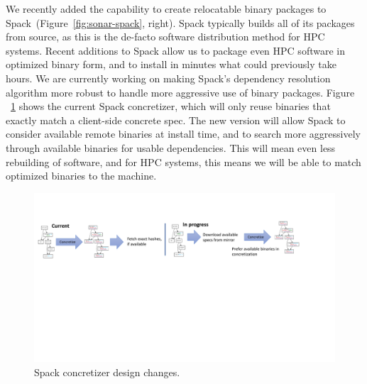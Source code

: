 We recently added the capability to create relocatable binary packages to
Spack~(Figure~\ref{fig:sonar-spack}, right).  Spack typically builds all
of its packages from source, as this is the de-facto software
distribution method for HPC systems. Recent additions to Spack allow us
to package even HPC software in optimized binary form, and to install in
minutes what could previously take hours. We are currently working on
making Spack's dependency resolution algorithm more robust to handle more
aggressive use of binary packages. Figure ~\ref{fig:concretize} shows the
current Spack concretizer, which will only reuse binaries that exactly
match a client-side concrete spec. The new version will allow Spack to
consider available remote binaries at install time, and to search more
aggressively through available binaries for usable dependencies. This
will mean even less rebuilding of software, and for HPC systems, this
means we will be able to match optimized binaries to the machine.

\begin{figure}[htb]
    \centering
    \includegraphics[width=\textwidth]{projects/2.3.5-Ecosystem/2.3.5.03-LLNL-ATDM-Ecosystem/spack-concretizer}
    \caption{\label{fig:concretize}
        Spack concretizer design changes.
    }
\end{figure}


